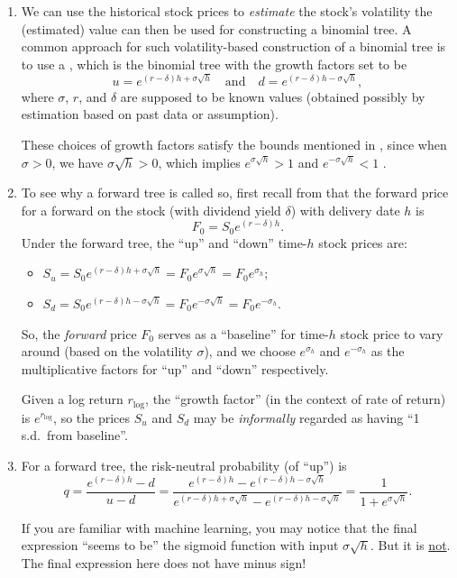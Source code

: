 \begin{enumerate}
\item We can use the historical stock prices to \emph{estimate} the stock's
volatility  the (estimated) value can then be used for
constructing a binomial tree.  A common approach for such volatility-based
construction of a binomial tree is to use a , which is the
binomial tree with the growth factors set to be
\[
u=e^{(r-\delta)h+\sigma\sqrt{h}}\quad\text{and}\quad d=e^{(r-\delta)h-\sigma\sqrt{h}},
\]
where \(\sigma\), \(r\), and \(\delta\) are supposed to be known values
(obtained possibly by estimation based on past data or assumption).

\begin{note}
These choices of growth factors satisfy the bounds mentioned in
, since when \(\sigma>0\), we have
\(\sigma\sqrt{h}>0\), which implies \(e^{\sigma\sqrt{h}}>1\) and
\(e^{-\sigma\sqrt{h}}<1\) .
\end{note}
\item To see why a forward tree is called so, first recall from
 that the forward price for a
forward on the stock  (with dividend yield \(\delta\)) with
delivery date \(h\) is
\[
F_0=S_0e^{(r-\delta)h}.
\]
Under the forward tree, the ``up'' and ``down'' time-\(h\) stock prices are:
\begin{itemize}
\item \(S_u=S_0e^{(r-\delta)h+\sigma\sqrt{h}}=F_0e^{\sigma\sqrt{h}}=F_0e^{\sigma_h}\);
\item \(S_d=S_0e^{(r-\delta)h-\sigma\sqrt{h}}=F_0e^{-\sigma\sqrt{h}}=F_0e^{-\sigma_h}\).
\end{itemize}
So, the \emph{forward} price \(F_0\) serves as a ``baseline'' for time-\(h\)
stock price to vary around (based on the volatility \(\sigma\)), and we choose
\(e^{\sigma_h}\) and \(e^{-\sigma_h}\) as the multiplicative factors for ``up''
and ``down'' respectively.
\begin{intuition}
Given a log return \(r_{\text{log}}\), the ``growth factor'' (in the context of
rate of return) is \(e^{r_{\text{log}}}\), so the prices \(S_u\) and \(S_d\)
may be \emph{informally} regarded as having ``1 s.d.\ from baseline''.
\end{intuition}

\item \label{it:fwd-tree-rn-prob-fmla}
For a forward tree, the risk-neutral probability (of ``up'') is
\[
q=\frac{e^{(r-\delta)h}-d}{u-d}
=\frac{e^{(r-\delta)h}-e^{(r-\delta)h-\sigma\sqrt{h}}}{e^{(r-\delta)h+\sigma\sqrt{h}}-e^{(r-\delta)h-\sigma\sqrt{h}}}
=\frac{1}{1+e^{\sigma\sqrt{h}}}.
\]
\begin{warning}
If you are familiar with machine learning, you may notice that the final
expression ``seems to be'' the sigmoid function with input \(\sigma\sqrt{h}\).
But it is \underline{not}. The final expression here does not have minus sign!
\end{warning}


\end{enumerate}
